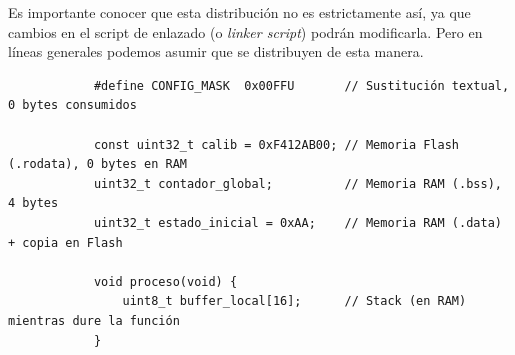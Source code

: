 \documentclass[../main.tex]{subfiles}
\begin{document}
        Es importante conocer que esta distribución no es estrictamente así, ya que cambios en el script de enlazado (o \emph{linker script}) podrán modificarla. Pero en líneas generales podemos asumir que se distribuyen de esta manera.

        \begin{lstlisting}
            #define CONFIG_MASK  0x00FFU       // Sustitución textual, 0 bytes consumidos

            const uint32_t calib = 0xF412AB00; // Memoria Flash (.rodata), 0 bytes en RAM
            uint32_t contador_global;          // Memoria RAM (.bss), 4 bytes
            uint32_t estado_inicial = 0xAA;    // Memoria RAM (.data) + copia en Flash

            void proceso(void) {
                uint8_t buffer_local[16];      // Stack (en RAM) mientras dure la función
            }
        \end{lstlisting}
\end{document}
